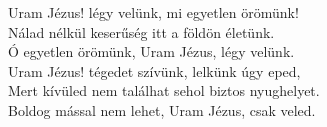 \documentclass[twoside]{article}
\begin{document}
Uram Jézus! légy velünk, mi egyetlen örömünk!\\
Nálad nélkül keserűség itt a földön életünk.\\
Ó egyetlen örömünk, Uram Jézus, légy velünk.\\

Uram Jézus! tégedet szívünk, lelkünk úgy eped,\\
Mert kívüled nem találhat sehol biztos nyughelyet.\\
Boldog mással nem lehet, Uram Jézus, csak veled.
\end{document}
